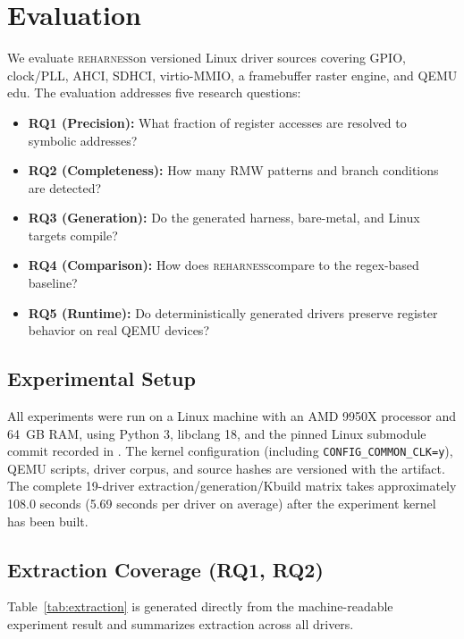 \documentclass[sigplan, screen, review, anonymous]{acmart}
\newcommand{\reharness}{\textsc{reharness}}
\begin{document}
\section{Evaluation}

We evaluate \reharness on \EvalDrivers{} versioned Linux driver sources covering GPIO, clock/PLL, AHCI, SDHCI, virtio-MMIO, a framebuffer raster engine, and QEMU edu. The evaluation addresses five research questions:

\begin{itemize}
\item \textbf{RQ1 (Precision):} What fraction of register accesses are resolved to symbolic addresses?
\item \textbf{RQ2 (Completeness):} How many RMW patterns and branch conditions are detected?
\item \textbf{RQ3 (Generation):} Do the generated harness, bare-metal, and Linux targets compile?
\item \textbf{RQ4 (Comparison):} How does \reharness compare to the regex-based baseline?
\item \textbf{RQ5 (Runtime):} Do deterministically generated drivers preserve register behavior on real QEMU devices?
\end{itemize}

\subsection{Experimental Setup}

All experiments were run on a Linux machine with an AMD 9950X processor and 64~GB RAM, using Python 3, libclang 18, and the pinned Linux submodule commit recorded in . The kernel configuration (including \texttt{CONFIG\_COMMON\_CLK=y}), QEMU scripts, driver corpus, and source hashes are versioned with the artifact. The complete 19-driver extraction/generation/Kbuild matrix takes approximately 108.0 seconds (5.69 seconds per driver on average) after the experiment kernel has been built.

\subsection{Extraction Coverage (RQ1, RQ2)}

Table~\ref{tab:extraction} is generated directly from the machine-readable experiment result and summarizes extraction across all \EvalDrivers{} drivers.

\begin{table}[t]
\centering
\caption{Extraction statistics across \EvalDrivers{} test drivers. Sym, Fixed, and Comp are distinct address classes.}
\label{tab:extraction}
\resizebox{\columnwidth}{!}{\ExtractionResultsTable}
\end{table}
\end{document}
